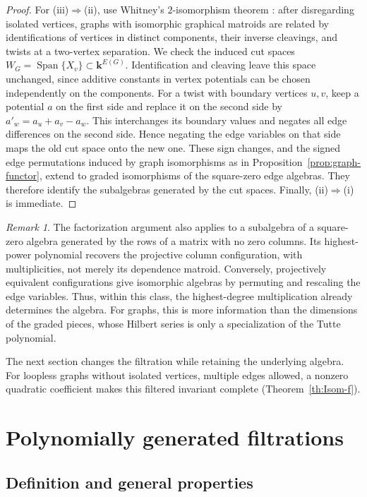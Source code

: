\documentclass[reqno]{article}
\theoremstyle{plain} %
\theoremstyle{definition}
\theoremstyle{remark}
\newtheorem{remark}[theorem]{\sc Remark}
\DeclareMathOperator{\Span}{Span}
\newcommand{\K} {\mathbf{k}}
\numberwithin{equation}{section}
\begin{document}
\begin{proof}
For (iii)$\Rightarrow$(ii), use Whitney's $2$-isomorphism theorem
\cite{Wh}: after disregarding isolated vertices, graphs with isomorphic
graphical matroids are related by identifications of vertices in distinct
components, their inverse cleavings, and twists at a two-vertex
separation. We check the induced cut spaces
$W_G=\Span\{X_v\}\subset\K^{E(G)}$.
Identification and cleaving leave this space unchanged, since additive
constants in vertex potentials can be chosen independently on the
components. For a twist with boundary vertices $u,v$, keep a potential
$a$ on the first side and replace it on the second side by
$a'_w=a_u+a_v-a_w$. This interchanges its boundary values and negates
all edge differences on the second side. Hence negating the edge
variables on that side maps the old cut space onto the new one.
These sign changes, and the signed edge permutations induced by
graph isomorphisms as in Proposition~\ref{prop:graph-functor}, extend
to graded isomorphisms of the square-zero edge algebras. They therefore identify the subalgebras generated by the cut
spaces. Finally, (ii)$\Rightarrow$(i) is immediate.
\end{proof}

\begin{remark}
The factorization argument also applies to a subalgebra of a square-zero
algebra generated by the rows of a matrix with no zero columns. Its
highest-power polynomial recovers the projective column configuration,
with multiplicities, not merely its dependence matroid. Conversely,
projectively equivalent configurations give isomorphic algebras by
permuting and rescaling the edge variables. Thus, within this class, the
highest-degree multiplication already determines the algebra. For graphs,
this is more information than the dimensions of the graded pieces, whose
Hilbert series is only a specialization of the Tutte polynomial.
\end{remark}

The next section changes the filtration while retaining the underlying
algebra. For loopless graphs without isolated vertices, multiple edges
allowed, a nonzero quadratic coefficient makes this filtered invariant
complete (Theorem~\ref{th:Isom-f}).


\section{Polynomially generated filtrations}
\label{sec:prel}

\subsection{Definition and general properties}
\label{sec:def-filt}
\end{document}
